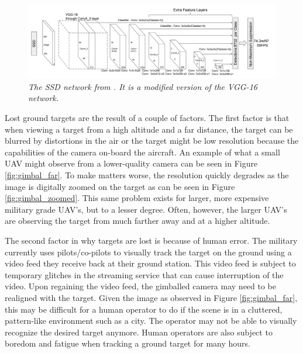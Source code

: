 \documentclass[letterpaper, 10 pt, conference]{ieeeconf}  %
\begin{document}
\begin{figure}
	\begin{center}
		\includegraphics[width=.95\textwidth]{ssd.png}
		\caption{\textit{The SSD network from \cite{liu2016ssd}. It is a modified version of the VGG-16 network.}} 
		\label{fig:ssd}
	\end{center}
\end{figure}

Lost ground targets are the result of a couple of factors. The first factor is that when viewing a target from a high altitude and a far distance, the target can be blurred by distortions in the air or the target might be low resolution because the capabilities of the camera on-board the aircraft. An example of what a small UAV might observe from a lower-quality camera can be seen in Figure \ref{fig:gimbal_far}. To make matters worse, the resolution quickly degrades as the image is digitally zoomed on the target as can be seen in Figure \ref{fig:gimbal_zoomed}. This same problem exists for larger, more expensive military grade UAV's, but to a lesser degree. Often, however, the larger UAV's are observing the target from much farther away and at a higher altitude.

The second factor in why targets are lost is because of human error. The military currently uses pilots/co-pilots to visually track the target on the ground using a video feed they receive back at their ground station. This video feed is subject to temporary glitches in the streaming service that can cause interruption of the video. Upon regaining the video feed, the gimballed camera may need to be realigned with the target. Given the image as observed in Figure \ref{fig:gimbal_far}, this may be difficult for a human operator to do if the scene is in a cluttered, pattern-like environment such as a city. The operator may not be able to visually recognize the desired target anymore. Human operators are also subject to boredom and fatigue when tracking a ground target for many hours. 
\end{document}
